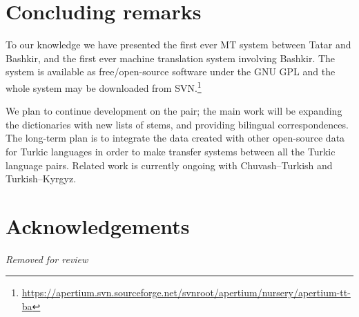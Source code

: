 \documentclass[11pt,a4paper]{article}
\begin{document}
\section{Concluding remarks}
\label{sec:conc}

To our knowledge we have presented the first ever MT system between Tatar and Bashkir, and the first ever machine translation system involving Bashkir. The system is available as free/open-source software under the GNU GPL and the 
whole system may be downloaded from SVN.\footnote{\url{https://apertium.svn.sourceforge.net/svnroot/apertium/nursery/apertium-tt-ba}}

We plan to continue development on the pair; the main work will be expanding the dictionaries with new lists of stems, and providing bilingual correspondences. The long-term plan is to integrate the data created with other open-source data for Turkic languages in order to make transfer systems between all the Turkic language pairs.  Related work is currently ongoing with Chuvash--Turkish and Turkish--Kyrgyz.

\section*{Acknowledgements}

{\em Removed for review}



\end{document}
